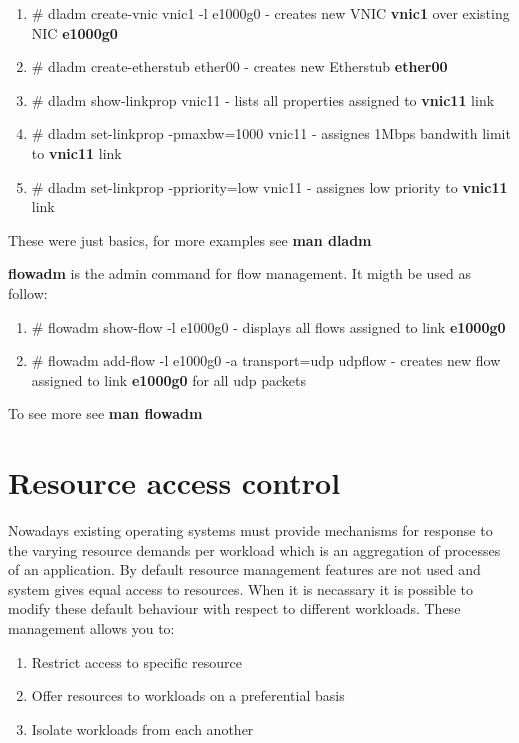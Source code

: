 \documentclass[11pt]{book}
\begin{document}
                        \begin{enumerate}
                        	\item{\# dladm create-vnic vnic1 -l e1000g0 - creates new VNIC \textbf{vnic1} over existing NIC \textbf{e1000g0}}
        	                \item{\# dladm create-etherstub ether00 - creates new Etherstub \textbf{ether00}}
                        	\item{\# dladm show-linkprop vnic11 - lists all properties assigned to \textbf{vnic11} link}
                        	\item{\# dladm set-linkprop -pmaxbw=1000 vnic11 - assignes 1Mbps bandwith limit to \textbf{vnic11} link}
                        	\item{\# dladm set-linkprop -ppriority=low vnic11 - assignes low priority to \textbf{vnic11} link}
                        \end{enumerate}

                        These were just basics, for more examples see \textbf{man dladm}

                        \medskip
        
                        \textbf{flowadm} is the admin command for flow management. It migth be used as follow:     

                        \begin{enumerate}
                                \item{\# flowadm show-flow -l e1000g0 - displays all flows assigned to link \textbf{e1000g0}}
                                \item{\# flowadm add-flow -l e1000g0 -a transport=udp udpflow - creates new flow assigned to link \textbf{e1000g0} for all udp packets}
                        \end{enumerate}

                        To see more see \textbf{man flowadm}
        

    \section{Resource access control}

                Nowadays existing operating systems must provide mechanisms for response to the varying resource 
		demands per workload which is an aggregation of processes of an application. By default resource management
		features are not used and system gives equal access to resources. When it is necassary it is possible 
		to modify these default behaviour with respect to different workloads. These management allows you to:
		\begin{enumerate}
        	\item{Restrict access to specific resource}
			\item{Offer resources to workloads on a preferential basis}
			\item{Isolate workloads from each another}
		\end{enumerate}
	
\end{document}
